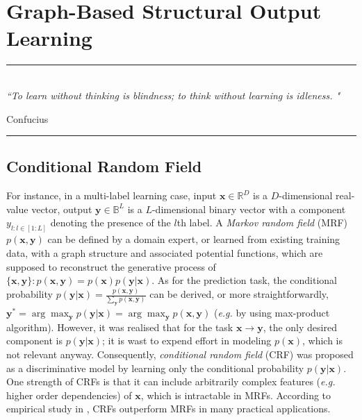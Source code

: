 
\chapter{Graph-Based Structural Output Learning} %
\label{Chapter3} %



\rule{\textwidth}{0.4pt} \\[0.5cm]
\textit{``To learn without thinking is blindness; to think without learning is idleness. "}

\begin{flushright}
Confucius
\end{flushright}
\rule{\textwidth}{0.4pt} 



\section{Conditional Random Field}
\label{sec:crf}
For instance, in a multi-label learning case, input $\mathbf{x}\in{\mathbb{R}^D}$ is a $D$-dimensional real-value vector, output $\mathbf{y}\in\mathbb{B}^L$ is a $L$-dimensional 
binary vector with a component $y_{l:l\in[1:L]}$ denoting the presence of the $l$th label. A \emph{Markov random field} (MRF) $p(\mathbf{x,y})$ can be defined by a  domain expert, or learned from 
existing training data, with a graph structure and 
associated potential functions, which are supposed to reconstruct the generative process of $\{\mathbf{x,y}\}: p(\mathbf{x,y})=p(\mathbf{x})p(\mathbf{y}|\mathbf{x})$. 
As for the prediction task, the conditional probability 
$p(\mathbf{y|x})=\frac{p(\mathbf{x,y})}{\sum_\mathbf{y} p(\mathbf{x,y})}$ can be derived, or more straightforwardly, 
$\mathbf{y}^*=\arg\max_{\mathbf{y}}p(\mathbf{y|x})=\arg\max_{\mathbf{y}}p(\mathbf{x,y})$ (\emph{e.g.} by using max-product algorithm). However, it was realised that for the task $\mathbf{x}\to\mathbf{y}$, the only desired
component is $p(\mathbf{y|x})$; it is wast to expend effort in modeling $p(\mathbf{x})$, which is not relevant anyway. Consequently, \emph{conditional random field} (CRF) was proposed \citep{CRF} as 
a discriminative model by learning only the conditional probability $p(\mathbf{y|x})$. One strength of CRFs is that it can include arbitrarily complex features (\emph{e.g.} higher order dependencies) 
of $\mathbf{x}$, which is intractable in MRFs. According to empirical study in \citep{Kumar03,CRF}, CRFs outperform MRFs in many practical applications. 

